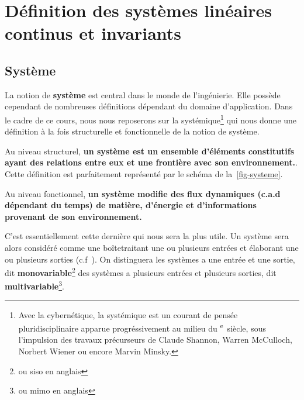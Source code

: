 \newpage
\section[Définition SLCI]{Définition des systèmes linéaires continus et invariants}

\subsection{Système}
La notion de \textbf{système} est central dans le monde de l'ingénierie.
Elle possède cependant de nombreuses définitions dépendant du domaine d'application.
Dans le cadre de ce cours, nous nous reposerons sur la systémique\footnote{Avec la 
cybernétique, la systémique est un courant de pensée pluridisciplinaire
apparue progréssivement au milieu du \textsc{}\textsuperscript{e}~siècle, sous l'impulsion
des travaux précurseurs de Claude Shannon, 
Warren McCulloch, Norbert Wiener ou encore Marvin Minsky.} 
qui nous donne une définition à la fois structurelle et fonctionnelle de la notion de système.

Au niveau structurel, \textbf{un système est un ensemble 
d'éléments constitutifs ayant des relations entre eux et 
une frontière avec son environnement.}. Cette définition est parfaitement
représenté par le schéma de la~\cref{fig-systeme}.

Au niveau fonctionnel, \textbf{un système modifie des flux dynamiques (c.a.d dépendant
du temps) de matière, d'énergie et d'informations provenant de son environnement.}

C'est essentiellement cette dernière qui nous sera la plus utile.
Un système sera alors considéré comme 
une \og boîte\fg traitant une ou plusieurs entrées et élaborant une ou plusieurs
sorties (c.f~). On distinguera les systèmes a une entrée et une 
sortie, dit \textbf{monovariable}\footnote{ou \gls{siso} en anglais}
des systèmes  a plusieurs entrées et plusieurs sorties, dit 
\textbf{multivariable}\footnote{ou \gls{mimo} en anglais}.

